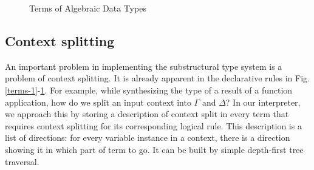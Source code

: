 \documentclass[a4paper,14pt]{extreport}
\begin{document}
\begin{figure}
    \centering
    \caption{Terms of Algebraic Data Types}
    \label{terms-2}
\end{figure}

\subsection{Context splitting}

An important problem in implementing the substructural type system is a problem
of context splitting. It is already apparent in the declarative rules in
Fig.\ref{terms-1}-\ref{terms-2}. For example, while synthesizing the type of a
result of a function application, how do we split an input context into $\Gamma$
and $\Delta$? In our interpreter, we approach this by storing a description of
context split in every term that requires context splitting for its
corresponding logical rule. This description is a list of directions: for every
variable instance in a context, there is a direction showing it in which part of
term to go. It can be built by simple depth-first tree traversal.
\end{document}
